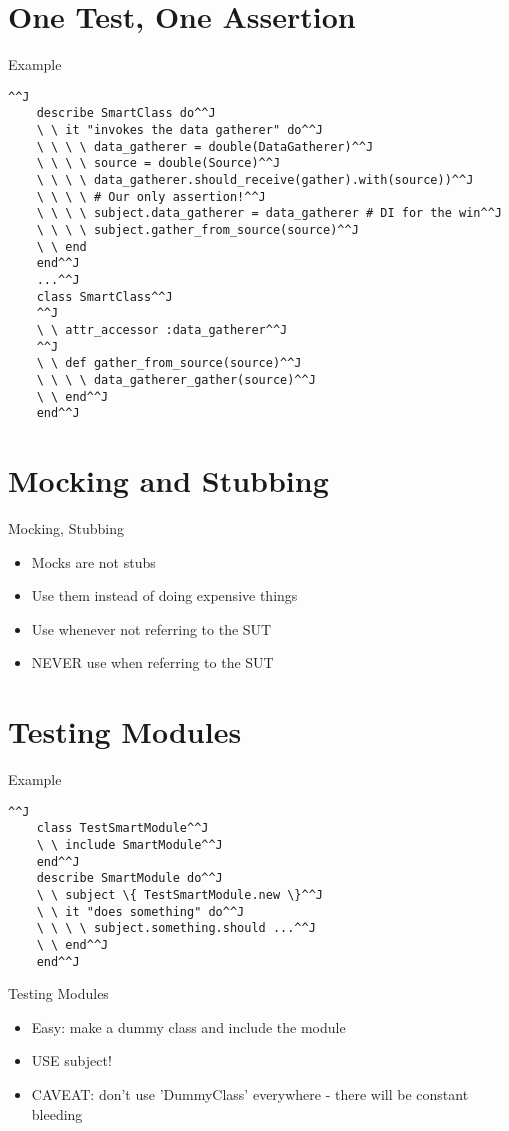 \documentclass[style=paintings,display=slidesnotes,clock]{powerdot}
\begin{document}
\section{One Test, One Assertion}
\begin{slide}{Example}
	\begin{lstlisting}[frame=shadowbox]^^J
	describe SmartClass do^^J
	\ \ it "invokes the data gatherer" do^^J
	\ \ \ \ data_gatherer = double(DataGatherer)^^J
	\ \ \ \ source = double(Source)^^J
	\ \ \ \ data_gatherer.should_receive(gather).with(source))^^J
	\ \ \ \ # Our only assertion!^^J
	\ \ \ \ subject.data_gatherer = data_gatherer # DI for the win^^J
	\ \ \ \ subject.gather_from_source(source)^^J
	\ \ end
	end^^J
	...^^J
	class SmartClass^^J
	^^J
	\ \ attr_accessor :data_gatherer^^J
	^^J
	\ \ def gather_from_source(source)^^J
	\ \ \ \ data_gatherer_gather(source)^^J
	\ \ end^^J
	end^^J
	\end{lstlisting}
\end{slide}
\section{Mocking and Stubbing}
\begin{note}{Mocking, Stubbing}
	\begin{itemize}
		\item Mocks are not stubs
		\item Use them instead of doing expensive things
		\item Use whenever not referring to the SUT
		\item NEVER use when referring to the SUT
	\end{itemize}
\end{note}
\section{Testing Modules}
\begin{slide}{Example}
	\begin{lstlisting}[frame=shadowbox]^^J
	class TestSmartModule^^J
	\ \ include SmartModule^^J
	end^^J
	describe SmartModule do^^J
	\ \ subject \{ TestSmartModule.new \}^^J
	\ \ it "does something" do^^J
	\ \ \ \ subject.something.should ...^^J
	\ \ end^^J
	end^^J
	\end{lstlisting}
\end{slide}
\begin{note}{Testing Modules}
	\begin{itemize}
		\item Easy: make a dummy class and include the module
		\item USE subject!
		\item CAVEAT: don't use 'DummyClass' everywhere - there will be constant bleeding
	\end{itemize}
\end{note}
\end{document}
